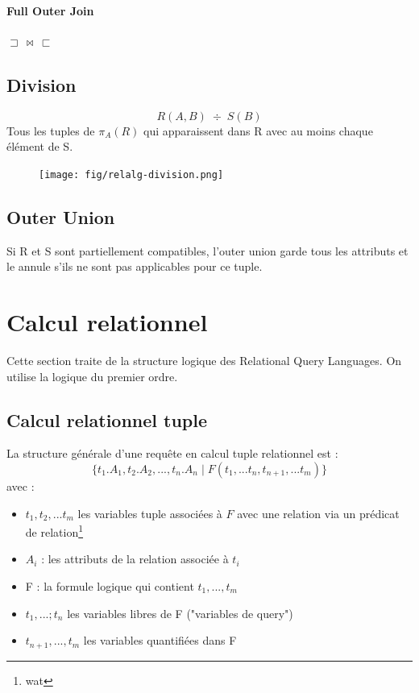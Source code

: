 \documentclass[a4paper]{article}
\begin{document}
  \paragraph{Full Outer Join} $\sqsupset\,\bowtie\,\sqsubset$

  \subsection{Division}
  $$ R(A,B)\; \div\; S(B) $$
  Tous les tuples de $\pi_{A}(R)$ qui apparaissent dans R avec au moins chaque
  élément de S.

  \begin{figure}[H]
    \center
    \texttt{[image: fig/relalg-division.png]}
  \end{figure}

  \subsection{Outer Union}
  Si R et S sont partiellement compatibles, l'outer union garde tous les attributs
  et le annule s'ils ne sont pas applicables pour ce tuple.


\section{Calcul relationnel}
  Cette section traite de la structure logique des Relational Query Languages.
  On utilise la logique du premier ordre.\\

  \subsection{Calcul relationnel tuple}
  La structure générale d'une requête en calcul tuple relationnel est :
  $$ \{t_1.A_1, t_2.A_2,...,t_n.A_n\; | \; F(t_1, ... t_n,t_{n+1},...t_{m})\} $$
  avec :
  \begin{itemize}
    \item $t_1, t_2,...t_m$ les variables tuple associées à $F$ avec une relation
    via un prédicat de relation\footnote{wat}
    \item $A_i$ : les attributs de la relation associée à $t_i$
    \item F : la formule logique qui contient $t_1,...,t_m$
    \item $t_1,...;t_n$ les variables libres de F ("variables de query")
    \item $t_{n+1},...,t_m$ les variables quantifiées dans F
  \end{itemize}
\end{document}
